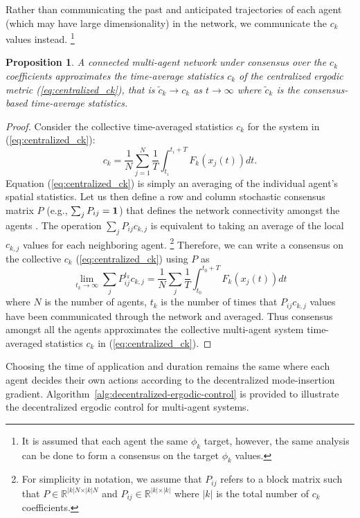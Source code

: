 \documentclass[letterpaper, 10 pt, conference]{ieeeconf}  %
\newtheorem{proposition}{Proposition}
\begin{document}
Rather than communicating the past and anticipated trajectories of each agent (which may have large dimensionality) in the network, we communicate the $c_k$ values instead. \footnote{It is assumed that each agent  the same $\phi_k$ target, however, the same analysis can be done to form a consensus on the target $\phi_k$ values.}
\begin{proposition}
A connected multi-agent network under consensus over the $c_k$ coefficients approximates the time-average statistics $c_k$ of the centralized ergodic metric (\ref{eq:centralized_ck}), that is $\tilde{c}_k \to c_k$ as $t \to \infty$ where $\tilde{c}_k$ is the consensus-based time-average statistics.
\end{proposition}
\begin{proof}
Consider the collective time-averaged statistics $c_k$ for the system in (\ref{eq:centralized_ck}):
\begin{equation*}
c_k = \frac{1}{N} \sum_{j=1}^N \frac{1}{T} \int_{t_i}^{t_i + T} F_k(x_j(t))dt.
\end{equation*}
Equation (\ref{eq:centralized_ck}) is simply an averaging of the individual agent's spatial statistics. 
Let us then define a row and column stochastic consensus matrix $P$ (e.g., $\sum_j P_{ij} = \bold{1}$) that defines the network connectivity amongst the agents \cite{deo2016graph, bertsekas1989parallel}.
The operation $\sum_j P_{ij} c_{k,j}$ is equivalent to taking an average of the local $c_{k,j}$ values for each neighboring agent. \footnote{For simplicity in notation, we assume that $P_{ij}$ refers to a block matrix such that $P \in \mathbb{R}^{\vert k \vert N \times \vert k \vert N}$ and $P_{ij} \in \mathbb{R}^{\vert k \vert \times \vert k \vert}$ where $\vert k \vert$ is the total number of $c_k$ coefficients.} 
Therefore, we can write a consensus on the collective $c_k$ (\ref{eq:centralized_ck}) using $P$ as \cite{deo2016graph, bertsekas1989parallel}
\begin{equation*}
\lim_{t_k \to \infty}\sum_j P_{ij}^{t_k} c_{k,j} = \frac{1}{N}\sum_j \frac{1}{T} \int_{t_0}^{t_0 +T} F_k(x_j(t)) dt
\end{equation*}
where $N$ is the number of agents, $t_k$ is the number of times that $P_{ij}c_{k,j}$ values have been communicated through the network and averaged.
Thus consensus amongst all the agents approximates the collective multi-agent system time-averaged statistics $c_k$ in (\ref{eq:centralized_ck}).
\end{proof}
Choosing the time of application and duration remains the same where each agent decides their own actions according to the decentralized mode-insertion gradient.
Algorithm~\ref{alg:decentralized-ergodic-control} is provided to illustrate the decentralized ergodic control for multi-agent systems.
\end{document}
